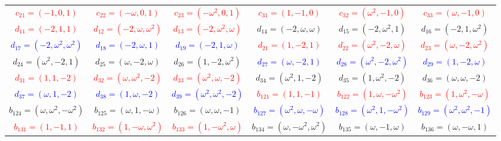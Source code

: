 \documentclass[%
  reprint,
  superscriptaddress,
  showpacs,
  showkeys,
  amsmath,amssymb,
  pra,
  longbibliography,
  floatfix,
  x11names
]{revtex4-2}
\begin{document}
\begin{table}[htbp!]
\begin{ruledtabular}
\begin{tabular}{*{6}{c}}
\textcolor{red}{$c_{21}=(-1,0,1)$} & \textcolor{red}{$c_{22}=(-\omega,0,1)$} & \textcolor{red}{$c_{23}=(-\omega^2,0,1)$} & \textcolor{red}{$c_{31}=(1,-1,0)$} & \textcolor{red}{$c_{32}=(\omega^2,-1,0)$} & \textcolor{red}{$c_{33}=(\omega,-1,0)$} \\
\textcolor{red}{$d_{11}=(-2,1,1)$} & \textcolor{red}{$d_{12}=(-2,\omega,\omega^2)$} & \textcolor{red}{$d_{13}=(-2,\omega^2,\omega)$} & \textcolor{green!40!black}{$d_{14}=(-2,\omega,\omega)$} & \textcolor{green!40!black}{$d_{15}=(-2,\omega^2,1)$} & \textcolor{green!40!black}{$d_{16}=(-2,1,\omega^2)$} \\
\textcolor{blue}{$d_{17}=(-2,\omega^2,\omega^2)$} & \textcolor{blue}{$d_{18}=(-2,\omega,1)$} & \textcolor{blue}{$d_{19}=(-2,1,\omega)$} & \textcolor{red}{$d_{21}=(1,-2,1)$} & \textcolor{red}{$d_{22}=(\omega^2,-2,\omega)$} & \textcolor{red}{$d_{23}=(\omega,-2,\omega^2)$} \\
\textcolor{green!40!black}{$d_{24}=(\omega^2,-2,1)$} & \textcolor{green!40!black}{$d_{25}=(\omega,-2,\omega)$} & \textcolor{green!40!black}{$d_{26}=(1,-2,\omega^2)$} & \textcolor{blue}{$d_{27}=(\omega,-2,1)$} & \textcolor{blue}{$d_{28}=(\omega^2,-2,\omega^2)$} & \textcolor{blue}{$d_{29}=(1,-2,\omega)$} \\
\textcolor{red}{$d_{31}=(1,1,-2)$} & \textcolor{red}{$d_{32}=(\omega,\omega^2,-2)$} & \textcolor{red}{$d_{33}=(\omega^2,\omega,-2)$} & \textcolor{green!40!black}{$d_{34}=(\omega^2,1,-2)$} & \textcolor{green!40!black}{$d_{35}=(1,\omega^2,-2)$} & \textcolor{green!40!black}{$d_{36}=(\omega,\omega,-2)$} \\
\textcolor{blue}{$d_{37}=(\omega,1,-2)$} & \textcolor{blue}{$d_{38}=(1,\omega,-2)$} & \textcolor{blue}{$d_{39}=(\omega^2,\omega^2,-2)$} & \textcolor{red}{$b_{121}=(1,1,-1)$} & \textcolor{red}{$b_{122}=(1,\omega,-\omega^2)$} & \textcolor{red}{$b_{123}=(1,\omega^2,-\omega)$} \\
\textcolor{green!40!black}{$b_{124}=(\omega,\omega^2,-\omega^2)$} & \textcolor{green!40!black}{$b_{125}=(\omega,1,-\omega)$} & \textcolor{green!40!black}{$b_{126}=(\omega,\omega,-1)$} & \textcolor{blue}{$b_{127}=(\omega^2,\omega,-\omega)$} & \textcolor{blue}{$b_{128}=(\omega^2,1,-\omega^2)$} & \textcolor{blue}{$b_{129}=(\omega^2,\omega^2,-1)$} \\
\textcolor{red}{$b_{131}=(1,-1,1)$} & \textcolor{red}{$b_{132}=(1,-\omega,\omega^2)$} & \textcolor{red}{$b_{133}=(1,-\omega^2,\omega)$} & \textcolor{green!40!black}{$b_{134}=(\omega,-\omega^2,\omega^2)$} & \textcolor{green!40!black}{$b_{135}=(\omega,-1,\omega)$} & \textcolor{green!40!black}{$b_{136}=(\omega,-\omega,1)$} \\

\end{tabular}
\end{ruledtabular}
\end{table}
\end{document}
